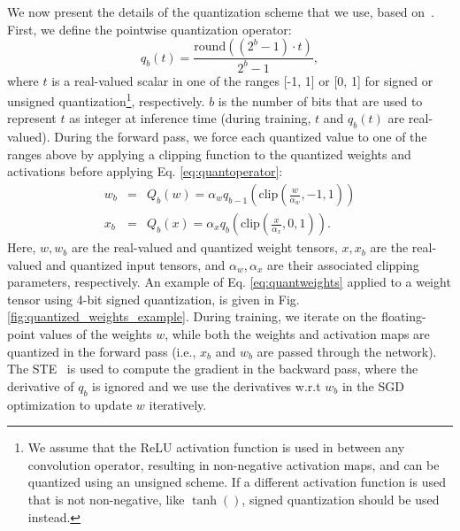 \documentclass[reqno]{amsart}
\begin{document}
We now present the details of the quantization scheme that we use, based on~\cite{li2019apot}. First, we define the pointwise quantization operator:
\begin{equation}
\label{eq:quantoperator}
    q_b(t) = \frac{\mbox{round}((2^b - 1) \cdot t)}{2^b - 1},
\end{equation}
where $t$ is a real-valued scalar in one of the ranges [-1, 1] or [0, 1] for signed or unsigned quantization\footnote{We assume that the ReLU activation function is used in between any convolution operator, resulting in non-negative activation maps, and can be quantized using an unsigned scheme. If a different activation function is used that is not non-negative, like $\tanh()$, signed quantization should be used instead.}, respectively. $b$ is the number of bits that are used to represent $t$ as integer at inference time (during training, $t$ and $q_b(t)$ are real-valued). During the forward pass, we force each quantized value to one of the ranges above by applying a clipping function to the quantized weights and activations before applying Eq. \eqref{eq:quantoperator}: 
 \begin{eqnarray} \label{eq:quantweights}
 w_b &=& Q_b(w) =  \alpha_w q_{b-1}\left(\mbox{clip}\left(\frac{w}{\alpha_w}, -1, 1\right)\right) \nonumber \\
x_b &=& Q_b(x) =  \alpha_x q_{b}\left(\mbox{clip}\left(\frac{x}{\alpha_x}, 0, 1\right)\right).
\end{eqnarray}
 Here, $w, w_b$ are the real-valued and quantized weight tensors, $x, x_b$ are the real-valued and quantized input tensors, and $\alpha_w, \alpha_x$ are their associated clipping parameters, respectively. An example of Eq. \eqref{eq:quantweights} applied to a weight tensor using 4-bit signed quantization, is given in Fig. \ref{fig:quantized_weights_example}. During training, we iterate on the floating-point values of the weights $w$, while both the weights and activation maps are quantized in the forward pass (i.e., $x_b$ and $w_b$ are passed through the network). The STE~\cite{yoshuabengio2013} is used to compute the gradient in the backward pass, where the derivative of $q_b$ is ignored and we use the derivatives w.r.t $w_b$ in the SGD optimization to update $w$ iteratively. 
\end{document}
